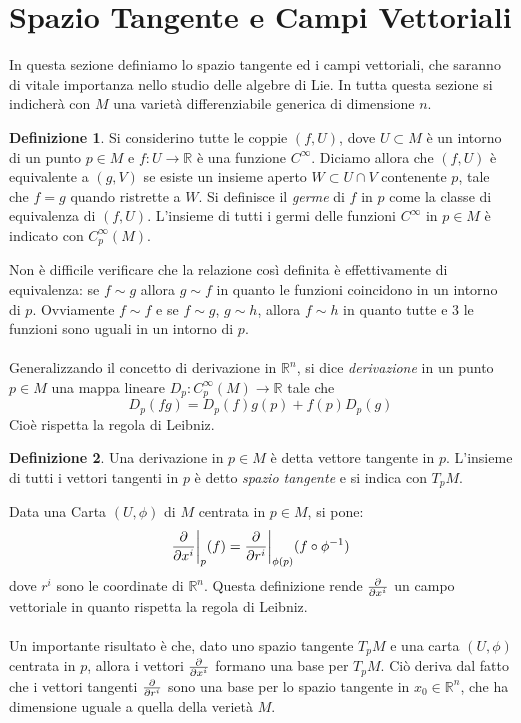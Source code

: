 \documentclass[12pt,a4paper]{report}
\theoremstyle{definition}
\newtheorem{Def}{Definizione}[chapter]
\theoremstyle{Theorem}
\theoremstyle{definition}
\theoremstyle{definition}
\theoremstyle{definition}
\begin{document}
\section{Spazio Tangente e Campi Vettoriali}
In questa sezione definiamo lo spazio tangente ed i campi vettoriali, che saranno di vitale importanza nello studio delle algebre di Lie. In tutta questa sezione si indicherà con $M$ una varietà differenziabile generica di dimensione $n$. 
\begin{Def}
	Si considerino tutte le coppie $(f,U)$, dove $U\subset M$ è un intorno di un punto $p\in M$ e $f:U\rightarrow \mathbb{R}$ è una funzione $C^\infty$. Diciamo allora che $(f,U)$ è equivalente a $(g,V)$ se esiste un insieme aperto $W\subset U\cap V$ contenente $p$, tale che $f=g$ quando ristrette a $W$. Si definisce il \textit{germe} di $f$ in $p$ come la classe di equivalenza di $(f,U)$.
	L'insieme di tutti i germi delle funzioni $C^\infty$ in $p\in M$ è indicato con $C^\infty_p(M)$.
\end{Def}
Non è difficile verificare che la relazione così definita è effettivamente di equivalenza: se $f\sim g$ allora $g\sim f$ in quanto le funzioni coincidono in un intorno di $p$. Ovviamente $f\sim f$ e se $f\sim g$, $g\sim h$, allora $f\sim h$ in quanto tutte e 3 le funzioni sono uguali in un intorno di $p$.\\
\\
Generalizzando il concetto di derivazione in $\mathbb{R}^n$, si dice \textit{derivazione} in un punto $p\in M$ una mappa lineare $D_p:C^\infty_p(M)\rightarrow\mathbb{R}$ tale che $$D_p(fg)=D_p(f)g(p)+f(p)D_p(g)$$
Cioè rispetta la regola di Leibniz.
\begin{Def}
	Una derivazione in $p\in M$ è detta vettore tangente in $p$. L'insieme di tutti i vettori tangenti in $p$ è detto \textit{spazio tangente} e si indica con $T_pM$.
\end{Def} 
Data una Carta $(U,\phi)$ di $M$ centrata in $p\in M$, si pone:
$${\partial\over \partial x^i}\bigg\rvert_p(f)={\partial\over \partial r^i}\bigg\rvert_{\phi(p)}(f\circ \phi^{-1})$$ dove $r^i$ sono le coordinate di $\mathbb{R}^n$.
Questa definizione rende ${\partial\over \partial x^i}$ un campo vettoriale in quanto rispetta la regola di Leibniz.\\
\\
Un importante risultato è che, dato uno spazio tangente $T_pM$ e una carta $(U,\phi)$ centrata in $p$, allora i vettori $\partial\over \partial x^i$ formano una base per $T_pM$. Ciò deriva dal fatto che i vettori tangenti $\partial\over \partial r^i$ sono una base per lo spazio tangente in $x_0\in\mathbb{R}^n$, che ha dimensione uguale a quella della verietà $M$.\\
\end{document}
